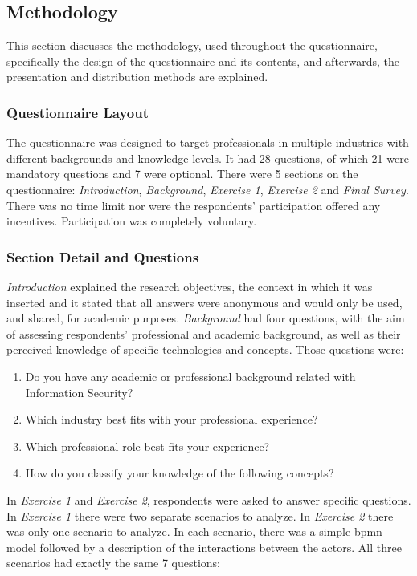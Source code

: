 \subsection{Methodology}

This section discusses the methodology, used throughout the questionnaire, specifically the design of the questionnaire and its contents, and afterwards, the presentation and distribution methods are explained.

\subsubsection{Questionnaire Layout}

The questionnaire was designed to target professionals in multiple industries with different backgrounds and knowledge levels. It had 28 questions, of which 21 were mandatory questions and 7 were optional. There were 5 sections on the questionnaire: \textit{Introduction}, \textit{Background}, \textit{Exercise 1}, \textit{Exercise 2} and \textit{Final Survey}. There was no time limit nor were the respondents' participation offered any incentives. Participation was completely voluntary.

\subsubsection{Section Detail and Questions}

\textit{Introduction} explained the research objectives, the context in which it was inserted and it stated that all answers were anonymous and would only be used, and shared, for academic purposes.
%
\textit{Background} had four questions, with the aim of assessing respondents' professional and academic background, as well as their perceived knowledge of specific technologies and concepts. Those questions were:

\begin{enumerate}
	\item Do you have any academic or professional background related with Information Security?
	\item Which industry best fits with your professional experience?
	\item Which professional role best fits your experience?
	\item How do you classify your knowledge of the following concepts?
\end{enumerate}

In \textit{Exercise 1} and \textit{Exercise 2}, respondents were asked to answer specific questions. In \textit{Exercise 1} there were two separate scenarios to analyze. In \textit{Exercise 2} there was only one scenario to analyze. In each scenario, there was a simple \gls{bpmn} \cite{BPMN} model followed by a description of the interactions between the actors. All three scenarios had exactly the same 7 questions:

